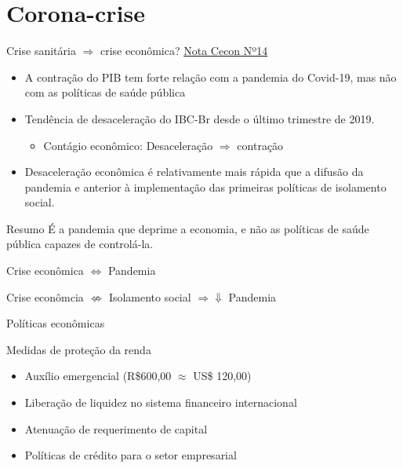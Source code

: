\documentclass[presentation]{beamer}
\begin{document}
\section{Corona-crise}
\label{sec:org82716c3}

\begin{frame}[label={sec:org0797522}]{Crise sanitária \(\Rightarrow\) crise econômica? \href{https://www.economia.unicamp.br/covid19/o-impacto-economico-da-pandemia-do-covid-19-e-a-contracao-do-pib-no-primeiro-trimestre-de-2020-nao-e-culpa-da-politica-de-saude-publica}{Nota Cecon Nº14}}
\begin{itemize}
\item A contração do PIB tem forte relação com a pandemia do Covid-19, mas não com as políticas de saúde pública
\item Tendência de desaceleração do IBC-Br desde o último trimestre de 2019.
\begin{itemize}
\item Contágio econômico: Desaceleração \(\Rightarrow\) contração
\end{itemize}
\item Desaceleração econômica é relativamente mais rápida que a difusão da pandemia e anterior à implementação das primeiras políticas de isolamento social.
\end{itemize}

\begin{block}{Resumo}
É a \alert{pandemia} que deprime a economia, e não as políticas de saúde pública capazes de controlá-la.

Crise econômica \(\Leftrightarrow\) Pandemia

Crise econômcia \(\nLeftrightarrow\) Isolamento social \(\Rightarrow \Downarrow\) Pandemia
\end{block}
\end{frame}

\begin{frame}[label={sec:org5846345}]{Políticas econômicas}
\begin{block}{Medidas de proteção da renda}
\begin{itemize}
\item Auxílio emergencial (R\$600,00 \(\approx\) US\$ 120,00)
\item Liberação de liquidez no sistema financeiro internacional
\item Atenuação de requerimento de capital
\item Políticas de crédito para o setor empresarial
\end{itemize}
\end{block}
\end{frame}
\end{document}
